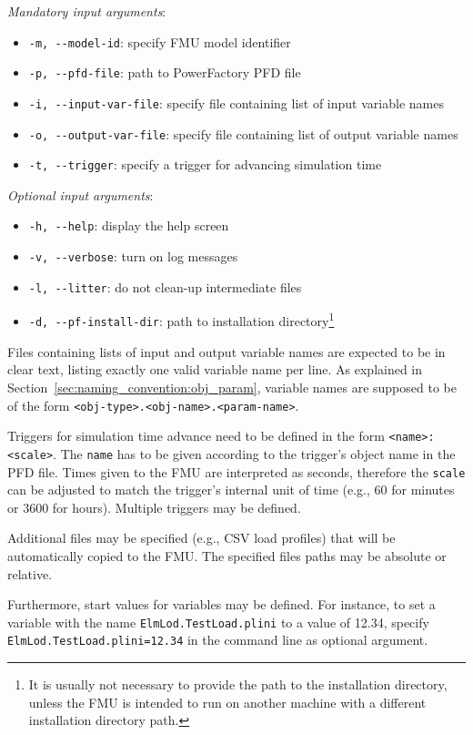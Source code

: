 \textit{Mandatory input arguments}:
\begin{itemize}
  \item \verb!-m, --model-id!: specify FMU model identifier
  \item \verb!-p, --pfd-file!: path to PowerFactory PFD file
  \item \verb!-i, --input-var-file!: specify file containing list of input variable names
  \item \verb!-o, --output-var-file!: specify file containing list of output variable names
  \item \verb!-t, --trigger!: specify a trigger for advancing simulation time
\end{itemize}
\textit{Optional input arguments}:
\begin{itemize}
  \item \verb!-h, --help!: display the help screen
  \item \verb!-v, --verbose!: turn on log messages
  \item \verb!-l, --litter!: do not clean-up intermediate files
  \item \verb!-d, --pf-install-dir!: path to \pf installation directory\footnote{It is usually not necessary to provide the path to the \pf installation directory, unless the FMU is intended to run on another machine with a different installation directory path.}
\end{itemize}
Files containing lists of input and output variable names are expected to be in clear text, listing exactly one valid variable name per line.
As explained in Section~\ref{sec:naming_convention:obj_param}, variable names are supposed to be of the  form \texttt{<obj-type>.<obj-name>.<param-name>}.

Triggers for simulation time advance need to be defined in the form \texttt{<name>:<scale>}.
The \texttt{name} has to be given according to the trigger's object name in the PFD file.
Times given to the FMU are interpreted as seconds, therefore the \texttt{scale} can be adjusted to match the trigger's internal unit of time (e.g., 60 for minutes or 3600 for hours).
Multiple triggers may be defined.

Additional files may be specified (e.g., CSV load profiles) that will be automatically copied to the FMU. The specified files paths may be absolute or relative.

Furthermore, start values for variables may be defined. For instance, to set a variable with the name \texttt{ElmLod.TestLoad.plini} to a value of 12.34, specify \texttt{ElmLod.TestLoad.plini=12.34} in the command line as optional argument.

